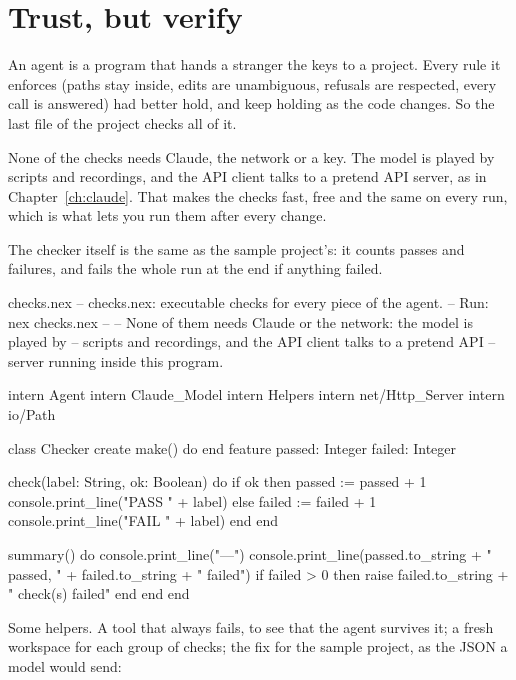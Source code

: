 \chapter{Trust, but verify}\label{ch:checks}

An agent is a program that hands a stranger the keys to a project. Every
rule it enforces (paths stay inside, edits are unambiguous, refusals are
respected, every call is answered) had better hold, and keep holding as the
code changes. So the last file of the project checks all of it.

None of the checks needs Claude, the network or a key. The model is played
by scripts and recordings, and the API client talks to a pretend API
server, as in Chapter~\ref{ch:claude}. That makes the checks fast, free and
the same on every run, which is what lets you run them after every change.

The checker itself is the same as the sample project's: it counts passes
and failures, and fails the whole run at the end if anything failed.

\begin{newfile}{checks.nex}
-- checks.nex: executable checks for every piece of the agent.
-- Run: nex checks.nex
--
-- None of them needs Claude or the network: the model is played by
-- scripts and recordings, and the API client talks to a pretend API
-- server running inside this program.

intern Agent
intern Claude_Model
intern Helpers
intern net/Http_Server
intern io/Path

class Checker
create
  make() do
  end
feature
  passed: Integer
  failed: Integer

  check(label: String, ok: Boolean) do
    if ok then
      passed := passed + 1
      console.print_line("PASS " + label)
    else
      failed := failed + 1
      console.print_line("FAIL " + label)
    end
  end

  summary() do
    console.print_line("---")
    console.print_line(passed.to_string + " passed, " + failed.to_string + " failed")
    if failed > 0 then
      raise failed.to_string + " check(s) failed"
    end
  end
end
\end{newfile}

Some helpers. A tool that always fails, to see that the agent survives
it; a fresh workspace for each group of checks; the fix for the sample
project, as the JSON a model would send:

